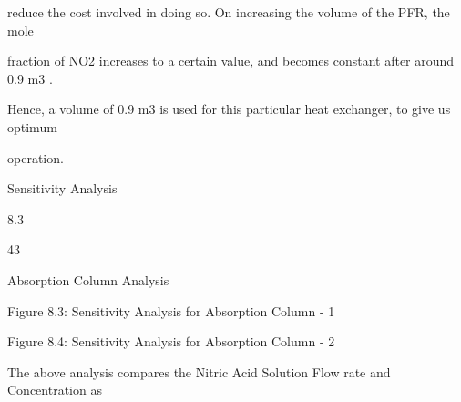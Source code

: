 \documentclass[a4paper,portrait,12pt]{article}
\begin{document}
\begin{flushleft}
reduce the cost involved in doing so. On increasing the volume of the PFR, the mole
\end{flushleft}


\begin{flushleft}
fraction of NO2 increases to a certain value, and becomes constant after around 0.9 m3 .
\end{flushleft}


\begin{flushleft}
Hence, a volume of 0.9 m3 is used for this particular heat exchanger, to give us optimum
\end{flushleft}


\begin{flushleft}
operation.
\end{flushleft}





\begin{flushleft}
\newpage
Sensitivity Analysis
\end{flushleft}





8.3





43





\begin{flushleft}
Absorption Column Analysis
\end{flushleft}





\begin{flushleft}
Figure 8.3: Sensitivity Analysis for Absorption Column - 1
\end{flushleft}





\begin{flushleft}
Figure 8.4: Sensitivity Analysis for Absorption Column - 2
\end{flushleft}





\begin{flushleft}
The above analysis compares the Nitric Acid Solution Flow rate and Concentration as
\end{flushleft}
\end{document}
